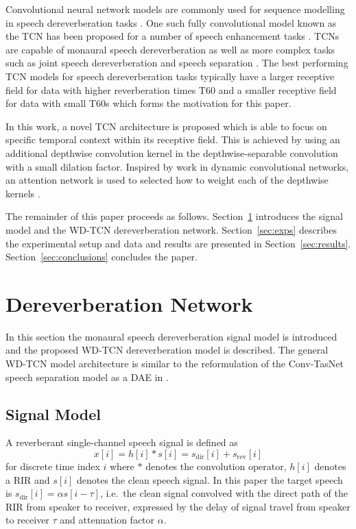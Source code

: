 \documentclass{article}
\begin{document}
Convolutional neural network models are commonly used for sequence modelling in speech dereverberation tasks \cite{Wang2021ConvolutivePF,Fu2021DESNetAM,su20b_interspeech}.
One such fully convolutional model known as the \ac{TCN} has been proposed for a number of speech enhancement tasks \cite{WHAMR, 9095210,8683634}. \Acp{TCN} are capable of monaural speech dereverberation as well as more complex tasks such as joint speech dereverberation and speech separation \cite{9095210}.
The best performing \ac{TCN} models for speech dereverberation tasks typically have a larger receptive field for data with higher reverberation times T60 and a smaller receptive field for data with small T60s \cite{rfield} which forms the motivation for this paper.

In this work, a novel \ac{TCN} architecture is proposed which is able to focus on specific temporal context within its receptive field. This is achieved by using an additional depthwise convolution kernel in the depthwise-separable convolution with a small dilation factor. Inspired by work in dynamic convolutional networks, an attention network is used to selected how to weight each of the depthwise kernels \cite{dynadnn,dynaconv}. 

The remainder of this paper proceeds as follows. Section~\ref{sec:WD-TCN} introduces the signal model and the \ac{WD-TCN} dereverberation network. Section~\ref{sec:exps} describes the experimental setup and data and results are presented in Section~\ref{sec:results}. Section~\ref{sec:conclusions} concludes the paper.


\section{Dereverberation Network}
\label{sec:WD-TCN}
In this section the monaural speech dereverberation signal model is introduced and the proposed \ac{WD-TCN} dereverberation model is described. The general \ac{WD-TCN} model architecture is similar to the reformulation of the Conv-TasNet speech separation model \cite{convtasnet} as a \ac{DAE} in \cite{rfield}.
\subsection{Signal Model}
A reverberant single-channel speech signal
is defined as
\begin{equation} \label{eq:SigModel}
    x[i] = h[i]\ast s[i] = s_\mathrm{dir}[i] + {s_\mathrm{rev}[i]}
\end{equation}
for discrete time index $i$ where $\ast$ denotes the convolution operator, $h[i]$ denotes a \ac{RIR} and $s[i]$ denotes the clean speech signal. 
In this paper the target speech is $s_\mathrm{dir}[i]=\alpha s[i-\tau]$, i.e.~the clean signal convolved with the direct path of the 
\ac{RIR} from speaker to receiver, expressed by the delay of signal travel from speaker to receiver $\tau$ and attenuation factor $\alpha$.
\end{document}
